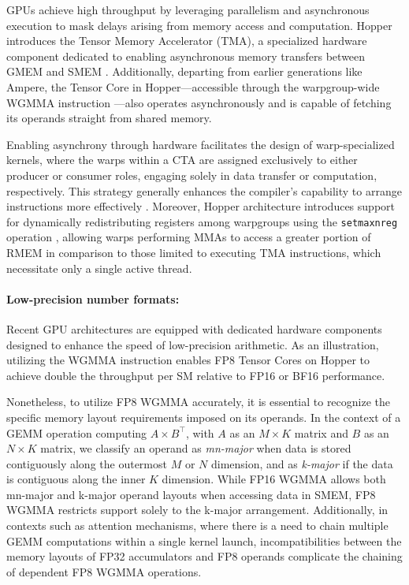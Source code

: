 GPUs achieve high throughput by leveraging parallelism and asynchronous execution to mask delays arising from memory access and computation. Hopper introduces the Tensor Memory Accelerator (TMA), a specialized hardware component dedicated to enabling asynchronous memory transfers between GMEM and SMEM \cite[\S7.29]{cuda}. Additionally, departing from earlier generations like Ampere, the Tensor Core in Hopper—accessible through the warpgroup-wide WGMMA instruction \cite[\S9.7.14]{ptx}—also operates asynchronously and is capable of fetching its operands straight from shared memory.

Enabling asynchrony through hardware facilitates the design of warp-specialized kernels, where the warps within a CTA are assigned exclusively to either producer or consumer roles, engaging solely in data transfer or computation, respectively. This strategy generally enhances the compiler’s capability to arrange instructions more effectively \citep{warp-specialization-2011}. Moreover, Hopper architecture introduces support for dynamically redistributing registers among warpgroups using the \verb|setmaxnreg| operation \cite[\S9.7.17.1]{ptx}, allowing warps performing MMAs to access a greater portion of RMEM in comparison to those limited to executing TMA instructions, which necessitate only a single active thread.

\paragraph{Low-precision number formats:}
\label{sec:low-precision-gpu}
Recent GPU architectures are equipped with dedicated hardware components designed to enhance the speed of low-precision arithmetic. As an illustration, utilizing the WGMMA instruction enables FP8 Tensor Cores on Hopper to achieve double the throughput per SM relative to FP16 or BF16 performance.

Nonetheless, to utilize FP8 WGMMA accurately, it is essential to recognize the specific memory layout requirements imposed on its operands. In the context of a GEMM operation computing $A \times B^{\top}$, with $A$ as an $M\times K$ matrix and $B$ as an $N\times K$ matrix, we classify an operand as \emph{mn-major} when data is stored contiguously along the outermost $M$ or $N$ dimension, and as \emph{k-major} if the data is contiguous along the inner $K$ dimension. While FP16 WGMMA allows both mn-major and k-major operand layouts when accessing data in SMEM, FP8 WGMMA restricts support solely to the k-major arrangement. Additionally, in contexts such as attention mechanisms, where there is a need to chain multiple GEMM computations within a single kernel launch, incompatibilities between the memory layouts of FP32 accumulators and FP8 operands complicate the chaining of dependent FP8 WGMMA operations.

